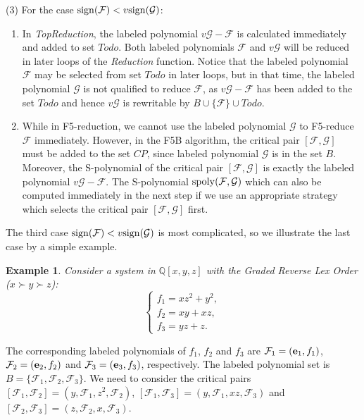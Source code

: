 \documentclass[preprint,authoryear,3p,12pt]{elsarticle}
\newtheorem{example}[theorem]{Example}
\def\eb{{\bf e}}
\def\sp{{\rm spoly}}
\def\Q{{\mathbb{Q}}}
\def\s{{\rm{sign}}}
\begin{document}
(3) For the case $\s({\mathcal F}) <  v\s({\mathcal G})$:
\begin{enumerate}

\item[$\bullet$] In {\em TopReduction}, the labeled polynomial
$v{\mathcal G}-{\mathcal F}$ is calculated immediately and added to set $Todo$. Both labeled polynomials ${\mathcal F}$ and
$v{\mathcal G}$ will be reduced in later loops of the {\em Reduction} function. Notice that the labeled polynomial ${\mathcal F}$
may be selected from set $Todo$ in later loops, but in that time, the labeled polynomial ${\mathcal G}$ is not qualified to
reduce ${\mathcal F}$, as $v{\mathcal G}-{\mathcal F}$ has been added to the set $Todo$ and hence $v{\mathcal G}$ is rewritable
by $B \cup \{{\mathcal F}\}\cup Todo$.

\item[$\bullet$] While in F5-reduction, we cannot use the labeled polynomial
${\mathcal G}$ to F5-reduce ${\mathcal F}$ immediately. However, in the F5B algorithm, the critical pair $[{\mathcal F},
{\mathcal G}]$ must be added to the set $CP$, since labeled polynomial ${\mathcal G}$ is in the set $B$. Moreover,
  the S-polynomial of the critical pair $[{\mathcal F}, {\mathcal G}]$ is exactly the
labeled polynomial $v{\mathcal G}-{\mathcal F}$.  The S-polynomial $\sp({\mathcal F}, {\mathcal G})$ which can also be computed
immediately in the  next step if we use an appropriate strategy which selects the critical pair $[{\mathcal F}, {\mathcal G}]$
first.
\end{enumerate}


The third case $\s({\mathcal F}) <  v\s({\mathcal G})$ is most
complicated, so we illustrate the last case by a simple example.

\begin{example}
Consider a system in $\Q[x, y, z]$ with the Graded Reverse Lex
Order ($x\succ y\succ z$):
$$\left\{\begin{array}{l} f_1=xz^2+y^2, \\
f_2=xy+xz, \\
f_3=yz+z.
\end{array}\right. $$
\end{example}

The corresponding labeled polynomials of $f_1$, $f_2$ and $f_3$
are ${\mathcal F}_1=(\eb_1, f_1)$, ${\mathcal F}_2=(\eb_2, f_2)$
and ${\mathcal F}_3=(\eb_3, f_3)$, respectively. The labeled
polynomial set is $B=\{{\mathcal F}_1, {\mathcal F}_2, {\mathcal
F}_3\}$. We need to consider the critical pairs $[{\mathcal F}_1,
{\mathcal F}_2]=(y, {\mathcal F}_1, z^2, {\mathcal F}_2)$,
$[{\mathcal F}_1, {\mathcal F}_3]=(y, {\mathcal F}_1, xz,
{\mathcal F}_3)$ and $[{\mathcal F}_2, {\mathcal F}_3]=(z,
{\mathcal F}_2, x, {\mathcal F}_3)$.
\end{document}

